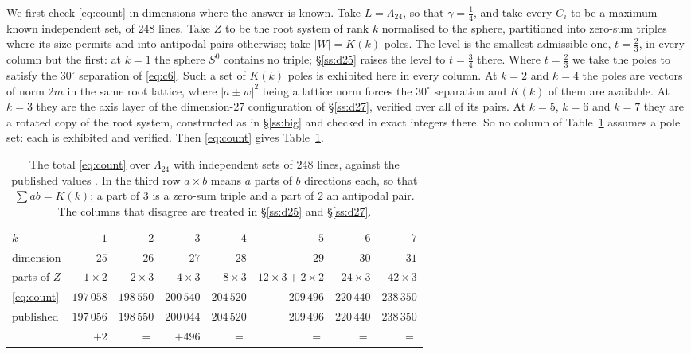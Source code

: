 \documentclass[11pt]{amsart}
\theoremstyle{remark}
\newcommand{\Leech}{\Lambda_{24}}
\begin{document}
We first check \eqref{eq:count} in dimensions where the answer is known. Take
$L=\Leech$, so that $\gamma=\tfrac14$, and take every $C_i$ to be a maximum known
independent set, of $248$ lines. Take $Z$ to be the root system of rank $k$
normalised to the sphere, partitioned into zero-sum triples where its size
permits and into antipodal pairs otherwise; take $|W|=K(k)$ poles. The level
is the smallest admissible one, $t=\tfrac23$, in every column but the first: at
$k=1$ the sphere $S^0$ contains no triple; \S\ref{ss:d25} raises the level to
$t=\tfrac34$ there. Where $t=\tfrac23$ we take the poles to satisfy the
$30^\circ$ separation of \eqref{eq:c6}. Such a set of $K(k)$ poles is exhibited
here in every column. At $k=2$ and $k=4$ the poles are vectors of norm $2m$ in the
same root lattice, where $|a\pm w|^2$ being a lattice norm forces the $30^\circ$
separation and $K(k)$ of them are available. At $k=3$ they are the axis layer of
the dimension-$27$ configuration of \S\ref{ss:d27}, verified over all of its
pairs. At $k=5$, $k=6$ and $k=7$ they are a rotated copy of the root system,
constructed as in \S\ref{ss:big} and checked in exact integers there. So no
column of Table~\ref{tab:calib} assumes a pole set: each is exhibited and
verified. Then
\eqref{eq:count} gives Table~\ref{tab:calib}.

\begin{table}[ht]
\caption{The total \eqref{eq:count} over $\Leech$ with independent sets of $248$
lines, against the published values \cite{cohn-table}. In the third row
$a{\times}b$ means $a$ parts of $b$ directions each, so that $\sum ab=K(k)$; a
part of $3$ is a zero-sum triple and a part of $2$ an antipodal pair. The
columns that disagree are treated in \S\ref{ss:d25} and \S\ref{ss:d27}.}
\label{tab:calib}
\small\setlength{\tabcolsep}{4.5pt}
\begin{tabular}{lrrrrrrr}
\toprule
$k$ & $1$ & $2$ & $3$ & $4$ & $5$ & $6$ & $7$\\
dimension & $25$ & $26$ & $27$ & $28$ & $29$ & $30$ & $31$\\
\midrule
parts of $Z$ & $1{\times}2$ & $2{\times}3$ & $4{\times}3$ & $8{\times}3$ & $12{\times}3{+}2{\times}2$ & $24{\times}3$ & $42{\times}3$\\
\eqref{eq:count} & $197\,058$ & $198\,550$ & $200\,540$ & $204\,520$ & $209\,496$ & $220\,440$ & $238\,350$\\
published & $197\,056$ & $198\,550$ & $200\,044$ & $204\,520$ & $209\,496$ & $220\,440$ & $238\,350$\\
\midrule
& $+2$ & $=$ & $+496$ & $=$ & $=$ & $=$ & $=$\\
\bottomrule
\end{tabular}
\end{table}
\end{document}
